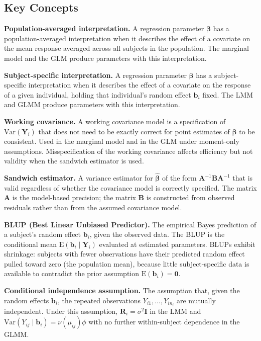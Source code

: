 \documentclass[11pt]{article}
\newcommand{\bY}{\mathbf{Y}}
\newcommand{\bbeta}{\boldsymbol{\beta}}
\newcommand{\E}{\mathrm{E}}
\newcommand{\Var}{\mathrm{Var}}
\begin{document}
\subsection*{Key Concepts}

\textbf{Population-averaged interpretation.} A regression parameter $\bbeta$ has a population-averaged interpretation when it describes the effect of a covariate on the mean response averaged across all subjects in the population. The marginal model and the GLM produce parameters with this interpretation.

\textbf{Subject-specific interpretation.} A regression parameter $\bbeta$ has a subject-specific interpretation when it describes the effect of a covariate on the response of a given individual, holding that individual's random effect $\mathbf{b}_i$ fixed. The LMM and GLMM produce parameters with this interpretation.

\textbf{Working covariance.} A working covariance model is a specification of $\Var(\bY_i)$ that does not need to be exactly correct for point estimates of $\bbeta$ to be consistent. Used in the marginal model and in the GLM under moment-only assumptions. Misspecification of the working covariance affects efficiency but not validity when the sandwich estimator is used.

\textbf{Sandwich estimator.} A variance estimator for $\hat{\bbeta}$ of the form $\mathbf{A}^{-1}\mathbf{B}\mathbf{A}^{-1}$ that is valid regardless of whether the covariance model is correctly specified. The matrix $\mathbf{A}$ is the model-based precision; the matrix $\mathbf{B}$ is constructed from observed residuals rather than from the assumed covariance model.

\textbf{BLUP (Best Linear Unbiased Predictor).} The empirical Bayes prediction of a subject's random effect $\mathbf{b}_i$, given the observed data. The BLUP is the conditional mean $\E(\mathbf{b}_i \mid \bY_i)$ evaluated at estimated parameters. BLUPs exhibit shrinkage: subjects with fewer observations have their predicted random effect pulled toward zero (the population mean), because little subject-specific data is available to contradict the prior assumption $\E(\mathbf{b}_i) = \mathbf{0}$.

\textbf{Conditional independence assumption.} The assumption that, given the random effects $\mathbf{b}_i$, the repeated observations $Y_{i1}, \ldots, Y_{in_i}$ are mutually independent. Under this assumption, $\mathbf{R}_i = \sigma^2 \mathbf{I}$ in the LMM and $\Var(Y_{ij} \mid \mathbf{b}_i) = \nu(\mu_{ij})\phi$ with no further within-subject dependence in the GLMM.
\end{document}

